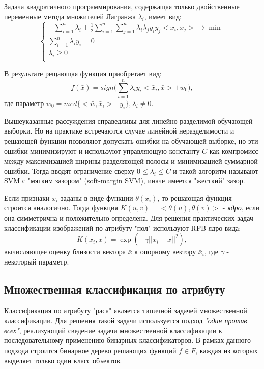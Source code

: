 \documentclass[12pt,a4paper]{article}
\begin{document}
Задача квадратичного программирования, содержащая только двойственные переменные метода множителей Лагранжа $\lambda_i$, имеет вид:
\begin{equation}
    \left\{
    \begin{array}{ll}
        -\sum_{i=1}^n{\lambda_i}+\frac{1}{2}\sum_{i=1}^n\sum_{j=1}^n{\lambda_i\lambda_jy_iy_j<\bar{x}_i,\bar{x}_j>}\rightarrow\min\\
        \sum_{i=1}^n{\lambda_iy_i}=0\\
        \lambda_i\geq0\\
    \end{array}
    \right.
\end{equation}

В результате рещающая функция приобретает вид:
\begin{equation}
    f(\bar{x})=sign(\sum_{i=1}^n{\lambda_iy_i<\bar{x}_i,\bar{x}>+w_0)},
\end{equation}
где параметр $w_0=med\{<\bar{w},\bar{x}_i>-y_i\}, \lambda_i\not=0$.

Вышеуказанные рассуждения справедливы для линейно разделимой обучающей выборки. Но на практике встречаются случае линейной неразделимости и решающей функции позволяют допускать ошибки на обучающей выборке, но эти ошибки минимизируют и используют управляющую константу $C$ как компромисс между максимизацией ширины разделяющей полосы и минимизацией суммарной ошибки. Тогда вводят ограничение сверху $0\leq\lambda_i\leq{C}$ и такой алгоритм называют SVM с "мягким зазором" (soft-margin SVM), иначе имеется "жесткий" зазор.

Если признаки $x_i$ заданы в виде функции $\theta(x_i)$, то решающая функция строится аналогично. Тогда функция $K(u,v)=<\theta(u),\theta(v)>$ - \textit{ядро}, если она симметрична и положительно определена. Для решения практических задач классификации изображений по атрибуту "пол" используют RFB-ядро вида:
\begin{equation}
    K(\bar{x}_i,\bar{x})=\exp{(-\gamma||\bar{x}_i-\bar{x}||^2)},
\end{equation}
вычисляющее оценку близости вектора $\bar{x}$ к опорному вектору $\bar{x}_i$, где $\gamma$ - некоторый параметр.

\subsection{Множественная классификация по атрибуту}
Классификация по атрибуту "раса" является типичной задачей множественной классификации. Для решения такой задачи используется подход \textit{"один против всех"}, реализующий сведение задачи множественной классификации к последовательному применению бинарных классификаторов. В рамках данного подхода строится бинарное дерево решающих функций $f\in{F}$, каждая из которых выделяет только один класс объектов.
\end{document}
